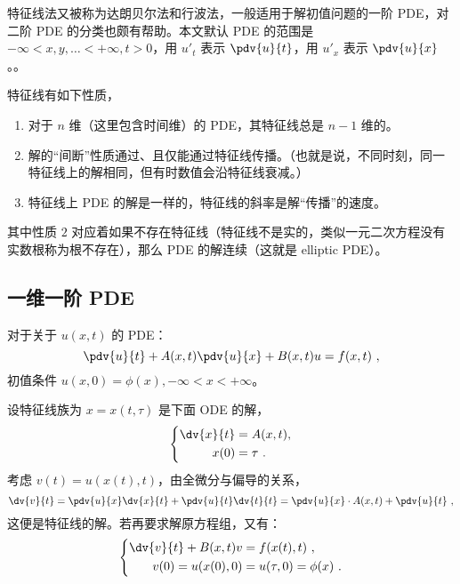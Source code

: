 
\begin{issues}
\issueMissDepend
\issueTODO
\issueDraft
\end{issues}

特征线法又被称为达朗贝尔法和行波法，一般适用于解初值问题的一阶 PDE，对二阶 PDE 的分类也颇有帮助。本文默认 PDE 的范围是 $-\infty < x, y, \dots < +\infty, t>0$，用 $u'_t$ 表示 $\pdv{u}{t}$，用 $u'_x$ 表示 $\pdv{u}{x}$。。

特征线有如下性质，
\begin{enumerate}
\item 对于 $n$ 维（这里包含时间维）的 PDE，其特征线总是 $n-1$ 维的。
\item 解的“间断”性质通过、且仅能通过特征线传播。（也就是说，不同时刻，同一特征线上的解相同，但有时数值会沿特征线衰减。）
\item 特征线上 PDE 的解是一样的，特征线的斜率是解“传播”的速度。
\end{enumerate}
其中性质 $2$ 对应着如果不存在特征线（特征线不是实的，类似一元二次方程没有实数根称为根不存在），那么 PDE 的解连续（这就是 elliptic PDE）。







\subsection{一维一阶 PDE}
\begin{theorem}{}
对于关于 $u(x, t)$ 的 PDE：
\begin{equation}
\pdv{u}{t} + A(x, t) \pdv{u}{x} + B(x, t) u = f(x, t) ~,
\end{equation}
初值条件 $u(x, 0) = \phi(x), -\infty < x < +\infty$。

设特征线族为 $x = x(t, \tau)$ 是下面 ODE 的解，
\begin{equation}
\left\{
\begin{aligned}
\dv{x}{t} &= A(x, t), \\
x(0) &= \tau ~.
\end{aligned}
\right .
\end{equation}
考虑 $v(t) = u(x(t), t)$，由全微分与偏导的关系，
$$\dv{v}{t} = \pdv{u}{x} \dv{x}{t} + \pdv{u}{t} \dv{t}{t} = \pdv{u}{x} \cdot A(x, t) + \pdv{u}{t} ~,$$
这便是特征线的解。若再要求解原方程组，又有：
\begin{equation}
\left\{
\begin{aligned}
\dv{v}{t} + B(x, t) v &= f(x(t), t) ~, \\
v(0) = u(x(0), 0) &= u(\tau, 0) = \phi(x) ~.
\end{aligned}
\right.
\end{equation}
\end{theorem}








